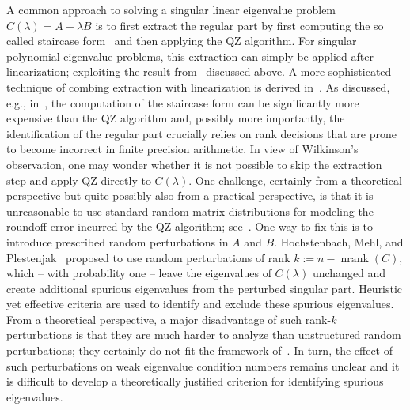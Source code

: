 \documentclass[12pt]{article}
\DeclareMathOperator{\nrank}{nrank}
\begin{document}
A common approach to solving a singular linear eigenvalue problem $C(\lambda) = A-\lambda B$ is to first extract the regular part by first computing the so called staircase form~\cite{Demmel1993,Demmel1993a,VanDooren1979} and then applying the QZ algorithm. For singular polynomial eigenvalue problems, this extraction can simply be applied after linearization; exploiting the result from~\cite{de2009linearizations} discussed above. A more sophisticated technique of combing extraction with linearization is derived in~\cite{byers2008trimmed}. As discussed, e.g., in~\cite[Pg. 1023]{hochstenbach2019solving}, the computation of the staircase form can be significantly more expensive than the QZ algorithm and, possibly more importantly, the identification of the regular part crucially relies on rank decisions that are prone to become incorrect in finite precision arithmetic. In view of Wilkinson's observation, one may wonder whether it is not possible to skip the extraction step and apply QZ directly to $C(\lambda)$.  One challenge, certainly from a theoretical perspective but quite possibly also from a practical perspective, is that it is unreasonable to use standard random matrix distributions for modeling the roundoff error incurred by the QZ algorithm; see~\cite[Sec. 2.8]{Higham2002}. One way to fix this is to introduce prescribed random perturbations in $A$ and $B$. Hochstenbach, Mehl, and Plestenjak~\cite{hochstenbach2019solving} proposed to use random perturbations of rank $k := n-\nrank(C)$, which -- with probability one -- leave the eigenvalues of $C(\lambda)$ unchanged and create
additional spurious eigenvalues from the perturbed singular part. Heuristic yet effective criteria are used to identify and exclude these spurious eigenvalues. From a theoretical perspective, a major disadvantage of such rank-$k$ perturbations is that they are much harder to analyze than unstructured random perturbations; they certainly do not fit the framework of~\cite{lotz2020wilkinson}. In turn, the effect of such perturbations on weak eigenvalue condition numbers remains unclear and it is difficult to develop a theoretically justified criterion for identifying spurious eigenvalues.
\end{document}
